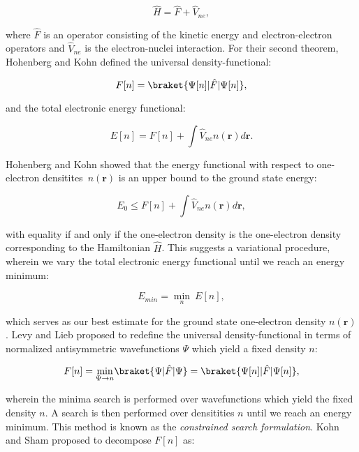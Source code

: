 \begin{equation}
 \hat{H} = \hat{F} + \hat{V}_{ne} ,
\end{equation}

where $\hat{F}$ is an operator consisting of the kinetic energy
and electron-electron operators and $\hat{V}_{ne}$
is the electron-nuclei interaction.
For their second theorem, Hohenberg and Kohn defined
the universal density-functional:

\begin{equation}
 F[n] = \braket{\Psi[n] | \hat{F} | \Psi[n]} ,
\end{equation}

and the total electronic energy functional:

\begin{equation}
 E[n] = F[n] + \int \hat{V}_{ne} n(\bm{r}) d\bm{r} .
\end{equation}

Hohenberg and Kohn showed that the energy functional
with respect to one-electron densitites $n(\bm{r})$
is an upper bound to the ground state energy:

\begin{equation}
 E_0 \leq F[n] + \int \hat{V}_{ne} n(\bm{r}) d\bm{r} ,
\end{equation}

with equality if and only if the one-electron density
is the one-electron density corresponding to the Hamiltonian $\hat{H}$.
This suggests a variational procedure, wherein
we vary the total electronic energy functional
until we reach an energy minimum:

\begin{equation}
 E_{min} = \underset{n}{\min} \ E[n] ,
\end{equation}

which serves as our best estimate for the ground state
one-electron density $n(\bm{r})$.
Levy and Lieb \cite{levy1979universal, perdew1982density, perdew1983physical}
proposed to redefine the universal density-functional
in terms of normalized antisymmetric wavefunctions $\Psi$
which yield a fixed density $n$:

\begin{equation}
 F[n] = \underset{\Psi \rightarrow n}{\min}
    \braket{\Psi | \hat{F} | \Psi}
    = \braket{\Psi[n] | \hat{F} | \Psi[n]} ,
\end{equation}

wherein the minima search is performed over wavefunctions
which yield the fixed density $n$.
A search is then performed over densitities $n$
until we reach an energy minimum. This method
is known as the \textit{constrained search formulation}.
Kohn and Sham proposed to decompose $F[n]$ as:

